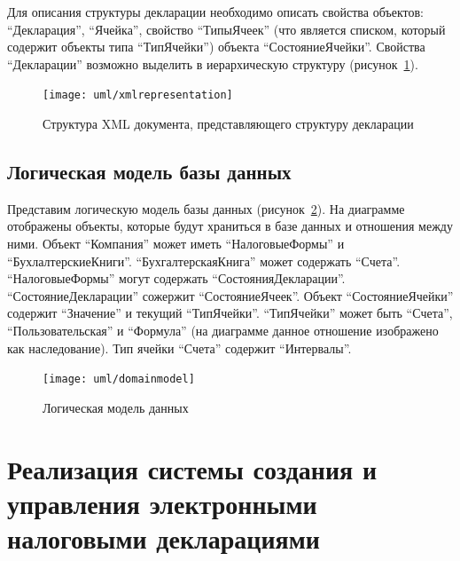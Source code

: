 \documentclass[14pt,a4paper]{reportmod}
\begin{document}
Для описания структуры декларации необходимо описать свойства объектов: ``Декларация'', ``Ячейка'', свойство ``ТипыЯчеек'' (что является списком, который содержит объекты типа ``ТипЯчейки'') объекта ``СостояниеЯчейки''. Свойства ``Декларации'' возможно выделить в иерархическую структуру (рисунок~\ref{pic:xmlrepresentation}).

\begin{figure}
  \centering
  \texttt{[image: uml/xmlrepresentation]}
  \caption{Структура XML документа, представляющего структуру декларации}
  \label{pic:xmlrepresentation}
\end{figure}

\section{Логическая модель базы данных}
Представим логическую модель базы данных (рисунок~\ref{pic:domain_model}). На диаграмме отображены объекты, которые будут храниться в базе данных и отношения между ними. Объект ``Компания'' может иметь ``НалоговыеФормы'' и ``БухлалтерскиеКниги''. ``БухгалтерскаяКнига'' может содержать ``Счета''. ``НалоговыеФормы'' могут содержать ``СостоянияДекларации''. ``СостояниеДекларации'' сожержит ``СостояниеЯчеек''. Объект ``СостояниеЯчейки'' содержит ``Значение'' и текущий ``ТипЯчейки''. ``ТипЯчейки'' может быть ``Счета'', ``Пользовательская'' и ``Формула'' (на диаграмме данное отношение изображено как наследование). Тип ячейки ``Счета'' содержит ``Интервалы''.

\begin{figure}
  \centering
  \texttt{[image: uml/domainmodel]}
  \caption{Логическая модель данных}
  \label{pic:domain_model}
\end{figure}

\chapter{Реализация системы создания и управления электронными налоговыми декларациями}
\end{document}
